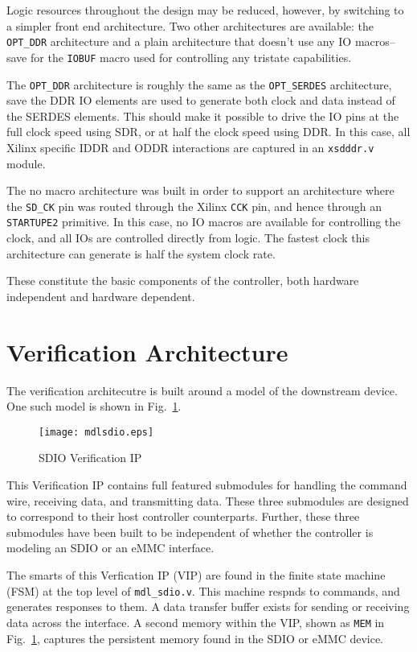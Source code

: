 \documentclass{gqtekspec}
\begin{document}
Logic resources throughout the design may be reduced, however, by switching
to a simpler front end architecture.  Two other architectures are available:
the {\tt OPT\_DDR} architecture and a plain architecture that doesn't use
any IO macros--save for the {\tt IOBUF} macro used for controlling any
tristate capabilities.

The {\tt OPT\_DDR} architecture is roughly the same as the {\tt OPT\_SERDES}
architecture, save the DDR IO elements are used to generate both clock and
data instead of the SERDES elements.  This should make it possible to drive
the IO pins at the full clock speed using SDR, or at half the clock speed
using DDR.  In this case, all Xilinx specific IDDR and ODDR interactions are
captured in an {\tt xsdddr.v} module.

The no macro architecture was built in order to support an architecture
where the {\tt SD\_CK} pin was routed through the Xilinx {\tt CCK} pin,
and hence through an {\tt STARTUPE2} primitive.  In this case, no IO macros
are available for controlling the clock, and all IOs are controlled directly
from logic.  The fastest clock this architecture can generate is half the
system clock rate.

These constitute the basic components of the controller, both hardware
independent and hardware dependent.

\section{Verification Architecture}\label{sec:arch-vip}

The verification architecutre is built around a model of the
downstream device.  One such model is shown in Fig.~\ref{fig:mdlsdio}.
\begin{figure}\begin{center}
\texttt{[image: mdlsdio.eps]}
\caption{SDIO Verification IP}\label{fig:mdlsdio}
\end{center}\end{figure}
This Verification IP contains full featured submodules for handling the
command wire, receiving data, and transmitting data.  These three submodules
are designed to correspond to their host controller counterparts.  Further,
these three submodules have been built to be independent of whether the
controller is modeling an SDIO or an eMMC interface.

The smarts of this Verfication IP (VIP) are found in the finite state machine
(FSM) at the top level of {\tt mdl\_sdio.v}.  This machine respnds to commands,
and generates responses to them.  A data transfer buffer exists for sending
or receiving data across the interface.  A second memory within the VIP,
shown as {\tt MEM} in Fig.~\ref{fig:mdlsdio}, captures the persistent memory
found in the SDIO or eMMC device.
\end{document}
